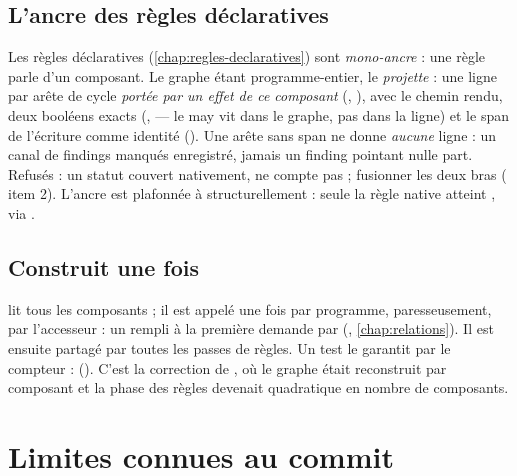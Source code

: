 \subsection{L'ancre  des règles déclaratives}


\begin{decision}[ADR-29]
Les règles déclaratives (\cref{chap:regles-declaratives}) sont \emph{mono-ancre} : une règle
parle d'un composant. Le graphe étant programme-entier,  le \emph{projette} : une
ligne par arête de cycle \emph{portée par un effet de ce composant}
(, ), avec le chemin
rendu, deux booléens exacts (,  --- le may vit dans le
graphe, pas dans la ligne) et le span de l'écriture comme identité (). Une arête
sans span ne donne \emph{aucune} ligne : un canal de findings manqués enregistré, jamais
un finding pointant nulle part. Refusés : un statut \og couvert nativement, ne compte
pas\fg{} ; fusionner les deux bras ( item 2). L'ancre est plafonnée à \Warning{}
structurellement : seule la règle native atteint \Error, via .
\end{decision}

\subsection{Construit une fois}

 lit tous les composants ; il est appelé une fois par programme,
paresseusement, par l'accesseur  : un  rempli
à la première demande par 
(, \cref{chap:relations}). Il est ensuite
partagé par toutes les passes de règles. Un test le garantit par le compteur  :
(). C'est la correction de , où le
graphe était reconstruit par composant et la phase des règles devenait quadratique en nombre
de composants.

\section{Limites connues au commit \snapshotCommit}
\label{sec:churn-limites}

